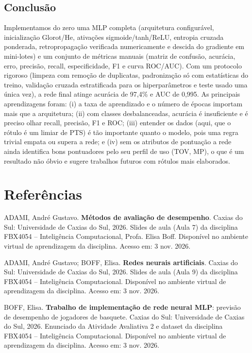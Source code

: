 \documentclass[11pt,a4paper]{article}
\begin{document}
\subsection{Conclusão}
Implementamos do zero uma MLP completa (arquitetura configurável, inicialização Glorot/He, ativações
sigmoide/tanh/ReLU, entropia cruzada ponderada, retropropagação verificada numericamente e descida do
gradiente em mini-lotes) e um conjunto de métricas manuais (matriz de confusão, acurácia, erro, precisão,
recall, especificidade, F1 e curva ROC/AUC). Com um protocolo rigoroso (limpeza com remoção de duplicatas,
padronização só com estatísticas do treino, validação cruzada estratificada para os hiperparâmetros e teste
usado uma única vez), a rede final atinge acurácia de 97,4\% e AUC de 0,995. As principais aprendizagens
foram: (i) a taxa de aprendizado e o número de épocas importam mais que a arquitetura; (ii) com classes
desbalanceadas, acurácia é insuficiente e é preciso olhar recall, precisão, F1 e ROC; (iii) entender os dados
(aqui, que o rótulo é um limiar de PTS) é tão importante quanto o modelo, pois uma regra trivial empata ou
supera a rede; e (iv) sem os atributos de pontuação a rede ainda identifica bons pontuadores pelo seu
perfil de uso (TOV, MP), o que é um resultado não óbvio e sugere trabalhos futuros com rótulos mais
elaborados.

\section*{Referências}
\begingroup
\small
\setlength{\parindent}{0pt}
\setlength{\parskip}{8pt}
\raggedright

ADAMI, André Gustavo. \textbf{Métodos de avaliação de desempenho}. Caxias do Sul: Universidade de Caxias do
Sul, 2026. Slides de aula (Aula 7) da disciplina FBX4054 -- Inteligência Computacional, Profa. Elisa Boff.
Disponível no ambiente virtual de aprendizagem da disciplina. Acesso em: 3 nov. 2026.

ADAMI, André Gustavo; BOFF, Elisa. \textbf{Redes neurais artificiais}. Caxias do Sul: Universidade de Caxias
do Sul, 2026. Slides de aula (Aula 9) da disciplina FBX4054 -- Inteligência Computacional. Disponível no
ambiente virtual de aprendizagem da disciplina. Acesso em: 3 nov. 2026.

BOFF, Elisa. \textbf{Trabalho de implementação de rede neural MLP}: previsão de desempenho de jogadores de
basquete. Caxias do Sul: Universidade de Caxias do Sul, 2026. Enunciado da Atividade Avaliativa 2 e dataset
da disciplina FBX4054 -- Inteligência Computacional. Disponível no ambiente virtual de aprendizagem da
disciplina. Acesso em: 3 nov. 2026.
\end{document}
